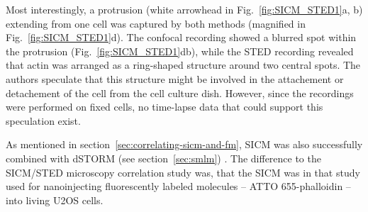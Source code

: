 Most interestingly, a protrusion (white arrowhead in
Fig.~\ref{fig:SICM_STED1}a, b) extending from one cell was captured by both
methods (magnified in Fig.~\ref{fig:SICM_STED1}d). The confocal recording
showed a blurred spot within the protrusion (Fig.~\ref{fig:SICM_STED1}db),
while the STED recording revealed that actin was arranged as a ring-shaped
structure around two central spots. The authors speculate that this structure
might be involved in the attachement or detachement of the cell from the cell
culture dish. However, since the recordings were performed on fixed cells, no
time-lapse data that could support this speculation exist.


As mentioned in section~\ref{sec:correlating-sicm-and-fm}, SICM was also successfully combined 
with dSTORM (see section~\ref{sec:smlm}) \cite{Hennig2015a}. The difference to the 
SICM/STED microscopy correlation study was, that the SICM was in that study used for nanoinjecting 
fluorescently labeled molecules -- ATTO 655-phalloidin -- into living U2OS cells. 


